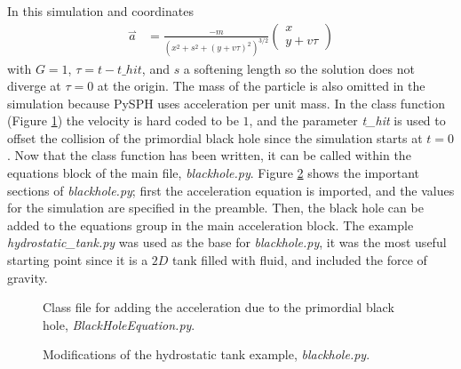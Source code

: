 \documentclass[12pt]{report}
\begin{document}
In this simulation and coordinates
\begin{align*}
\overset{\rightharpoonup}a &= \frac{-m}{\left( x^2 + s^2 + (y + v\tau)^2 \right)^{3/2}} \left( \begin{matrix}
x \\
y+v \tau
\end{matrix}
\right)
\end{align*}
with $G = 1$, $\tau = t-t\_hit$, and $s$ a softening length so the solution does not diverge at $\tau = 0$ at the origin. The mass of the particle is also omitted in the simulation because PySPH uses acceleration per unit mass. In the class function (Figure \ref{fig:blackholeclass}) the velocity is hard coded to be $1$, and the parameter \emph{t\_hit} is used to offset the collision of the primordial black hole since the simulation starts at $t = 0$. Now that the class function has been written, it can be called within the equations block of the main file, \emph{blackhole.py}. Figure \ref{fig:blackhole} shows the important sections of \emph{blackhole.py}; first the acceleration equation is imported, and the values for the simulation are specified in the preamble. Then, the black hole can be added to the equations group in the main acceleration block. The example \emph{hydrostatic\_tank.py} was used as the base for \emph{blackhole.py}, it was the most useful starting point since it is a $2D$ tank filled with fluid, and included the force of gravity. \\

\begin{figure}[p]

\caption{Class file for adding the acceleration due to the primordial black hole, \emph{BlackHoleEquation.py}.}
\label{fig:blackholeclass}
\end{figure}

\begin{figure}[p]
  
  
  
  
  
  
 \caption{Modifications of the hydrostatic tank example, \emph{blackhole.py}.}
 \label{fig:blackhole}
\end{figure}
\end{document}
